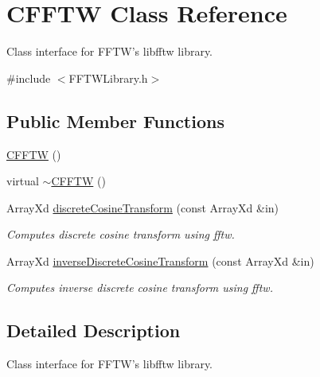 \hypertarget{class_c_f_f_t_w}{\section{C\-F\-F\-T\-W Class Reference}
\label{class_c_f_f_t_w}
}


Class interface for F\-F\-T\-W's libfftw library.  




{\ttfamily \#include $<$F\-F\-T\-W\-Library.\-h$>$}

\subsection*{Public Member Functions}
\begin{DoxyCompactItemize}
\item 
\hyperlink{class_c_f_f_t_w_a8306e328b4e54257f5c38b367dc93ff8}{C\-F\-F\-T\-W} ()
\item 
virtual \hyperlink{class_c_f_f_t_w_a29f9a0d485628e06e8db134dd48a81a7}{$\sim$\-C\-F\-F\-T\-W} ()
\item 
Array\-Xd \hyperlink{class_c_f_f_t_w_a83218155fb070ed39b07cc8bd956f188}{discrete\-Cosine\-Transform} (const Array\-Xd \&in)
\begin{DoxyCompactList}\small\item\em Computes discrete cosine transform using fftw. \end{DoxyCompactList}\item 
Array\-Xd \hyperlink{class_c_f_f_t_w_aa40c9ada6c75d44cbd49d98e094b412b}{inverse\-Discrete\-Cosine\-Transform} (const Array\-Xd \&in)
\begin{DoxyCompactList}\small\item\em Computes inverse discrete cosine transform using fftw. \end{DoxyCompactList}\end{DoxyCompactItemize}


\subsection{Detailed Description}
Class interface for F\-F\-T\-W's libfftw library. 

